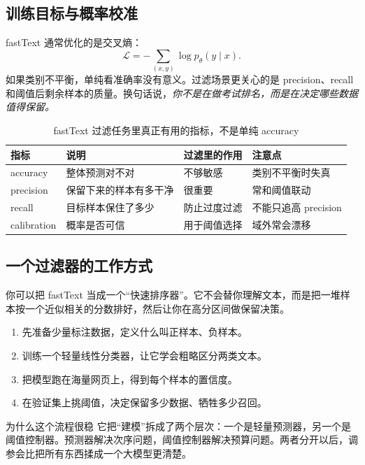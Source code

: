 \documentclass[a4paper]{article}
\begin{document}
\subsection{训练目标与概率校准}

fastText 通常优化的是交叉熵：
\[
\mathcal{L}=-\sum_{(x,y)} \log p_\theta(y\mid x).
\]
如果类别不平衡，单纯看准确率没有意义。过滤场景更关心的是 precision、recall 和阈值后剩余样本的质量。换句话说，\emph{你不是在做考试排名，而是在决定哪些数据值得保留。}

\begin{table}[H]
\centering
\small
\renewcommand{\arraystretch}{1.15}
\begin{tabular}{p{2.3cm}p{4.2cm}p{4.1cm}p{3.0cm}}
\toprule
\textbf{指标} & \textbf{说明} & \textbf{过滤里的作用} & \textbf{注意点} \\
\midrule
accuracy & 整体预测对不对 & 不够敏感 & 类别不平衡时失真 \\
precision & 保留下来的样本有多干净 & 很重要 & 常和阈值联动 \\
recall & 目标样本保住了多少 & 防止过度过滤 & 不能只追高 precision \\
calibration & 概率是否可信 & 用于阈值选择 & 域外常会漂移 \\
\bottomrule
\end{tabular}
\caption{fastText 过滤任务里真正有用的指标，不是单纯 accuracy}
\end{table}

\subsection{一个过滤器的工作方式}

你可以把 fastText 当成一个“快速排序器”。它不会替你理解文本，而是把一堆样本按一个近似相关的分数排好，然后让你在高分区间做保留决策。

\begin{enumerate}
    \item 先准备少量标注数据，定义什么叫正样本、负样本。
    \item 训练一个轻量线性分类器，让它学会粗略区分两类文本。
    \item 把模型跑在海量网页上，得到每个样本的置信度。
    \item 在验证集上挑阈值，决定保留多少数据、牺牲多少召回。
\end{enumerate}

\begin{importantbox}{为什么这个流程很稳}
它把“建模”拆成了两个层次：一个是轻量预测器，另一个是阈值控制器。预测器解决次序问题，阈值控制器解决预算问题。两者分开以后，调参会比把所有东西揉成一个大模型更清楚。
\end{importantbox}
\end{document}
